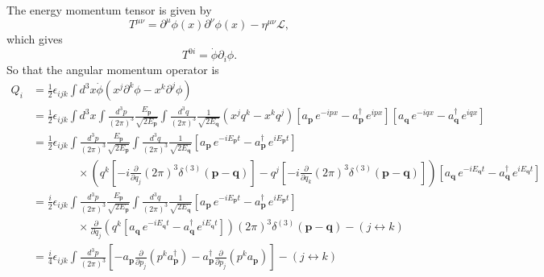 \begin{solution}
    The energy momentum tensor is given by 
    \begin{equation}
        T^{\mu\nu} = \partial^\mu\phi(x)\partial^\nu\phi(x) - \eta^{\mu\nu}\mathcal{L},
    \end{equation}
    which gives
    \begin{equation}
        T^{0i} = \dot{\phi}\partial_i\phi.
    \end{equation}
    So that the angular momentum operator is 
    \begin{equation}
    \begin{aligned}
        Q_i &= \frac{1}{2}\epsilon_{ijk}\int d^3x \dot{\phi}(x^j\partial^k\phi - x^k\partial^j\phi)\\
        &=\frac{1}{2}\epsilon_{ijk}\int d^3x \int\frac{d^3p}{(2\pi)^3}\frac{E_\mathbf{p}}{\sqrt{2E_\mathbf{p}}}\int\frac{d^3q}{(2\pi)^3}\frac{1}{\sqrt{2E_\mathbf{q}}}(x^jq^k- x^kq^j)\left[a_{\mathbf{p}}\,e^{-ipx} - a_{\mathbf{p}}^\dagger\,e^{ipx}\right]\left[a_{\mathbf{q}}\,e^{-iqx} - a_{\mathbf{q}}^\dagger\,e^{iqx}\right]\\
        &=\frac{1}{2}\epsilon_{ijk}\int \frac{d^3p}{(2\pi)^3}\frac{E_\mathbf{p}}{\sqrt{2E_\mathbf{p}}}\int\frac{d^3q}{(2\pi)^3}\frac{1}{\sqrt{2E_\mathbf{q}}}\left[a_{\mathbf{p}}\,e^{-iE_\mathbf{p}t} - a_{\mathbf{p}}^\dagger\,e^{iE_\mathbf{p}t}\right]\\
        &\qquad\qquad\times\left(q^k\!\left[-i\frac{\partial}{\partial q_j}(2\pi)^3\delta^{(3)}(\mathbf{p}-\mathbf{q})\right] - q^j\!\left[-i\frac{\partial}{\partial q_k}(2\pi)^3\delta^{(3)}(\mathbf{p}-\mathbf{q})\right]\right)\left[a_{\mathbf{q}}\,e^{-iE_\mathbf{q}t} - a_{\mathbf{q}}^\dagger\,e^{iE_\mathbf{q}t}\right]\\
        &= \frac{i}{2}\epsilon_{ijk}\int \frac{d^3p}{(2\pi)^3}\frac{E_\mathbf{p}}{\sqrt{2E_\mathbf{p}}}\int\frac{d^3q}{(2\pi)^3}\frac{1}{\sqrt{2E_\mathbf{q}}}\left[a_{\mathbf{p}}\,e^{-iE_\mathbf{p}t} - a_{\mathbf{p}}^\dagger\,e^{iE_\mathbf{p}t}\right]\\
        &\qquad\qquad \times \frac{\partial}{\partial q_j}\!\left(q^k\left[a_{\mathbf{q}}\,e^{-iE_\mathbf{q}t} - a_{\mathbf{q}}^\dagger\,e^{iE_\mathbf{q}t}\right]\right)(2\pi)^3\delta^{(3)}(\mathbf{p}-\mathbf{q}) - (j\leftrightarrow k)\\
        &= \frac{i}{4}\epsilon_{ijk}\int\frac{d^3p}{(2\pi)^3}\left[-a_\mathbf{p}\frac{\partial}{\partial p_j}\!\left(p^k a^\dagger_\mathbf{p}\right) - a^\dagger_\mathbf{p}\frac{\partial}{\partial p_j}\!\left(p^k a_\mathbf{p}\right)\right] - (j\leftrightarrow k)\\

\end{aligned}
\end{equation}
\end{solution}
